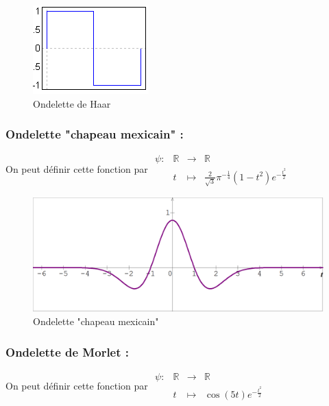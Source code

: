 \documentclass{article}
\begin{document}
\begin{figure}[!h]
\centering
\includegraphics[scale=1.1]{images/haar.png}
\caption{Ondelette de Haar}
\label{haar}
\end{figure}

\subsubsection{Ondelette "chapeau mexicain" :}

On peut définir cette fonction par $\begin{array}{lrcl}
\psi : & \mathbb{R} & \longrightarrow & \mathbb{R} \\
    & t & \longmapsto & \frac{2}{\sqrt{3}}\pi^{-\frac{1}{4}}(1-t^2)e^{-\frac{t^2}{2}} \end{array}$
    
\begin{figure}[!h]
\centering
\includegraphics[scale=0.2]{images/chapeau_mexicain.png}
\caption{Ondelette "chapeau mexicain"}
\label{chapmex}
\end{figure}
    
\subsubsection{Ondelette de Morlet :}

On peut définir cette fonction par $\begin{array}{lrcl}
\psi : & \mathbb{R} & \longrightarrow & \mathbb{R} \\
    & t & \longmapsto & \cos(5t)e^{-\frac{t^2}{2}} \end{array}$
    
\end{document}
